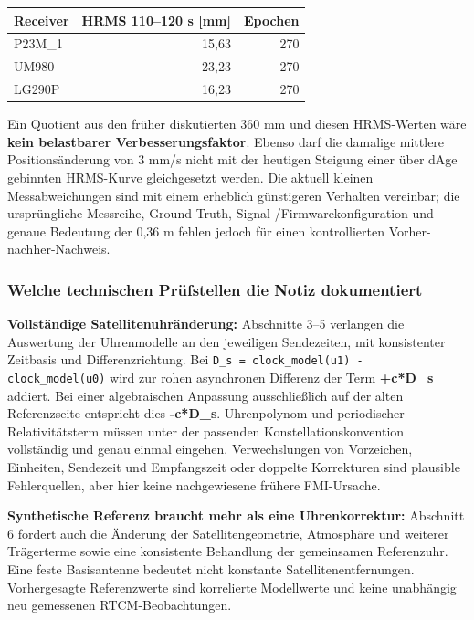 \documentclass[11pt,a4paper]{article}
\numberwithin{equation}{section}
\numberwithin{figure}{section}
\begin{document}
\begin{center}\begin{lrbox}{\reporttable}\small\setlength{\tabcolsep}{4pt}\begin{tabular}{lrr}\toprule
Receiver & HRMS 110–120 s [mm] & Epochen\\\midrule
P23M\_1 & 15,63 & 270\\
UM980 & 23,23 & 270\\
LG290P & 16,23 & 270\\
\bottomrule\end{tabular}\end{lrbox}\ifdim\wd\reporttable>\linewidth\resizebox{\linewidth}{!}{\usebox{\reporttable}}\else\usebox{\reporttable}\fi\end{center}

Ein Quotient aus den früher diskutierten 360 mm und diesen HRMS-Werten wäre \textbf{kein belastbarer Verbesserungsfaktor}. Ebenso darf die damalige mittlere Positionsänderung von 3 mm/\allowbreak{}s nicht mit der heutigen Steigung einer über dAge gebinnten HRMS-Kurve gleichgesetzt werden. Die aktuell kleinen Messabweichungen sind mit einem erheblich günstigeren Verhalten vereinbar; die ursprüngliche Messreihe, Ground Truth, Signal-/\allowbreak{}Firmwarekonfiguration und genaue Bedeutung der 0,36 m fehlen jedoch für einen kontrollierten Vorher-nachher-Nachweis.

\subsubsection{Welche technischen Prüfstellen die Notiz dokumentiert}

\textbf{Vollständige Satellitenuhränderung:} Abschnitte 3–5 verlangen die Auswertung der Uhrenmodelle an den jeweiligen Sendezeiten, mit konsistenter Zeitbasis und Differenzrichtung. Bei {\small\texttt{D\_\allowbreak{}s = clock\_\allowbreak{}model(u1) - clock\_\allowbreak{}model(u0)}} wird zur rohen asynchronen Differenz der Term \textbf{+c*D\_s} addiert. Bei einer algebraischen Anpassung ausschließlich auf der alten Referenzseite entspricht dies \textbf{-c*D\_s}. Uhrenpolynom und periodischer Relativitätsterm müssen unter der passenden Konstellationskonvention vollständig und genau einmal eingehen. Verwechslungen von Vorzeichen, Einheiten, Sendezeit und Empfangszeit oder doppelte Korrekturen sind plausible Fehlerquellen, aber hier keine nachgewiesene frühere FMI-Ursache.

\textbf{Synthetische Referenz braucht mehr als eine Uhrenkorrektur:} Abschnitt 6 fordert auch die Änderung der Satellitengeometrie, Atmosphäre und weiterer Trägerterme sowie eine konsistente Behandlung der gemeinsamen Referenzuhr. Eine feste Basisantenne bedeutet nicht konstante Satellitenentfernungen. Vorhergesagte Referenzwerte sind korrelierte Modellwerte und keine unabhängig neu gemessenen RTCM-Beobachtungen.
\end{document}
